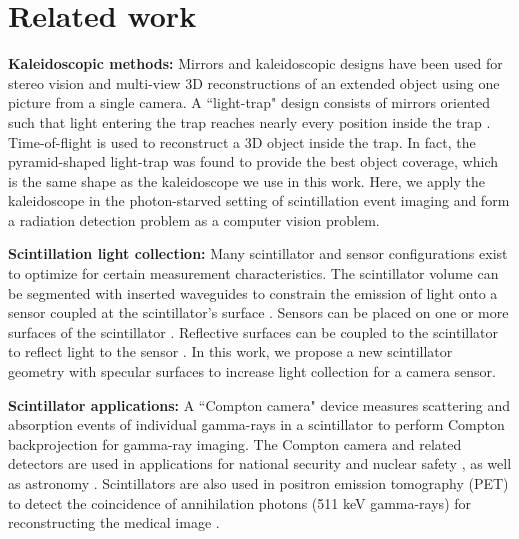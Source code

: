 \section{Related work}
\textbf{Kaleidoscopic methods:}
Mirrors and kaleidoscopic designs have been used for stereo vision \cite{nene1998stereo, gluckman1999planar, gluckman2002rectified} 
and multi-view 3D reconstructions \cite{reshetouski2011three, ahn2021kaleidoscopic, ahn2023neural, takahashi2021structure, bangay2004kaleidoscope, mitsumoto19923}
of an extended object using one picture from a single camera.
A ``light-trap" design consists of mirrors oriented such that light entering the trap reaches nearly every position inside the trap \cite{xu2018trapping}.
Time-of-flight is used to reconstruct a 3D object inside the trap.
In fact, the pyramid-shaped light-trap was found to provide the best object coverage, which is the same shape as the kaleidoscope we use in this work.
Here, we apply the kaleidoscope in the photon-starved setting of scintillation 
event imaging and form a radiation detection problem as a computer vision problem.

\noindent
\textbf{Scintillation light collection:}
Many scintillator and sensor configurations exist to optimize for certain 
measurement characteristics.
The scintillator volume can be segmented with inserted waveguides to constrain the emission of light onto a sensor coupled at the scintillator's surface \cite{kato2013novel, kishimoto2013development}.
Sensors can be placed on one or more surfaces of the scintillator \cite{yamaya2011sipm, kishimoto2013development}.
Reflective surfaces can be coupled to the scintillator to reflect light to the sensor \cite{gonzalez2017performance, folsom2021characterization, janecek2010simulating}.
In this work, we propose a new scintillator geometry with specular surfaces to 
increase light collection for a camera sensor.


\noindent
\textbf{Scintillator applications:}
A ``Compton camera" device \cite{kataoka2013handy, hosokoshi2019development, llosa2019sipm, parajuli2022development, kim2024comprehensive} 
measures scattering and absorption events of individual gamma-rays in a scintillator 
to perform Compton backprojection \cite{haefner2015filtered, xu2006filtered, wilderman1998list} for gamma-ray imaging.
The Compton camera and related detectors are used in applications for 
national security and nuclear safety \cite{vetter2018gamma}, as well as astronomy \cite{schonfelder1984imaging}.
Scintillators are also used in positron emission tomography (PET) to detect the 
coincidence of annihilation photons (511 keV gamma-rays) for reconstructing the 
medical image \cite{gonzalez2021evolution}.

